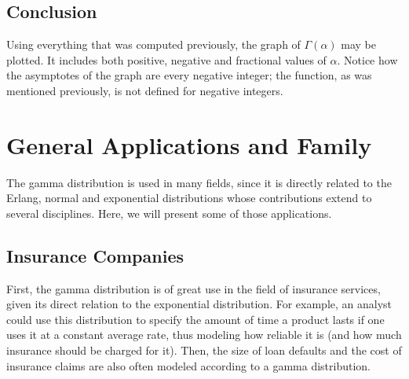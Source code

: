 \documentclass[12pt]{article}
\begin{document}

\pagebreak
\subsection{Conclusion}
Using everything that was computed previously, the graph of $\Gamma(\alpha)$ may be plotted. It includes both positive,
negative and fractional values of $\alpha$. Notice how the asymptotes of the graph are every negative integer; the
function, as was mentioned previously, is not defined for negative integers.


\pagebreak
\section{General Applications and Family}\label{sec:generalApplications}

The gamma distribution is used in many fields, since it is directly related to the Erlang, normal and exponential
distributions whose contributions extend to several disciplines. Here, we will present some of those applications.

\subsection{Insurance Companies}
First, the gamma distribution is of great use in the field of insurance services, given its direct relation to the
exponential distribution. For example, an analyst could use this distribution to specify the amount of time a product
lasts if one uses it at a constant average rate, thus modeling how reliable it is (and how much insurance should be
charged for it). Then, the size of loan defaults and the cost of insurance claims are also often modeled according to a
gamma distribution.
\end{document}
